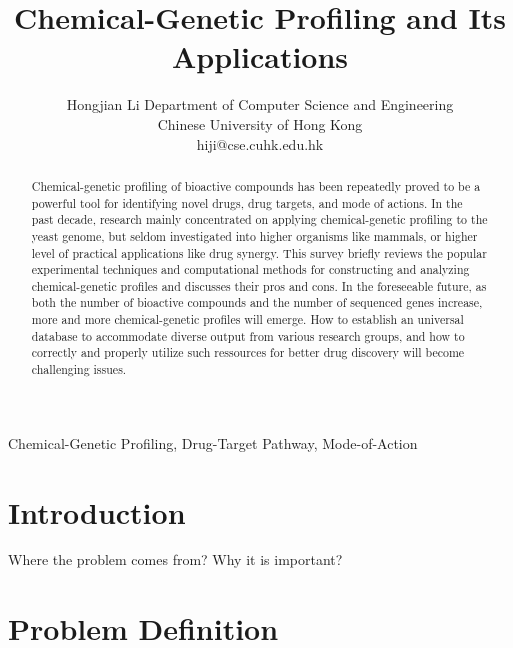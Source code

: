 \documentclass[12pt,conference,compsocconf]{../IEEEtran}
\begin{document}
\title{Chemical-Genetic Profiling and Its Applications}
\author
{
\IEEEauthorblockN
{
Hongjian Li
\IEEEauthorblockA
{
Department of Computer Science and Engineering\\
Chinese University of Hong Kong\\
hiji@cse.cuhk.edu.hk
}
}
}
\maketitle

\begin{abstract}

Chemical-genetic profiling of bioactive compounds has been repeatedly proved to be a powerful tool for identifying novel drugs, drug targets, and mode of actions. In the past decade, research mainly concentrated on applying chemical-genetic profiling to the yeast genome, but seldom investigated into higher organisms like mammals, or higher level of practical applications like drug synergy. This survey briefly reviews the popular experimental techniques and computational methods for constructing and analyzing chemical-genetic profiles and discusses their pros and cons. In the foreseeable future, as both the number of bioactive compounds and the number of sequenced genes increase, more and more chemical-genetic profiles will emerge. How to establish an universal database to accommodate diverse output from various research groups, and how to correctly and properly utilize such ressources for better drug discovery will become challenging issues.

\end{abstract}

\begin{IEEEkeywords}

Chemical-Genetic Profiling, Drug-Target Pathway, Mode-of-Action

\end{IEEEkeywords}

\section{Introduction}

Where the problem comes from?
Why it is important?

\section{Problem Definition}
\end{document}
